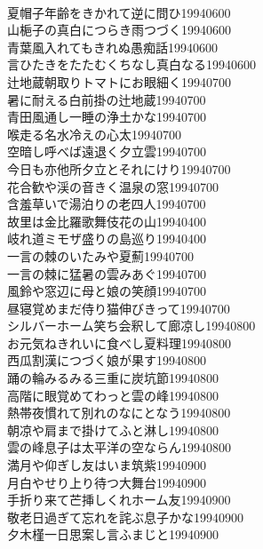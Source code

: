 \begin{multicols}{2}
\\夏帽子年齢をきかれて逆に問ひ\hfill{19940600}
\\山梔子の真白につらき雨つづく\hfill{19940600}
\\青葉風入れてもきれぬ愚痴話\hfill{19940600}
\\言ひたきをたたむくちなし真白なる\hfill{19940600}
\\辻地蔵朝取りトマトにお眼細く\hfill{19940700}
\\暑に耐える白前掛の辻地蔵\hfill{19940700}
\\青田風通し一睡の浄土かな\hfill{19940700}
\\喉走る名水冷えの心太\hfill{19940700}
\\空暗し呼べば遠退く夕立雲\hfill{19940700}
\\今日も亦他所夕立とそれにけり\hfill{19940700}
\\花合歓や渓の音きく温泉の窓\hfill{19940700}
\\含羞草いで湯泊りの老四人\hfill{19940700}
\\故里は金比羅歌舞伎花の山\hfill{19940400}
\\岐れ道ミモザ盛りの島巡り\hfill{19940400}
\\一言の棘のいたみや夏薊\hfill{19940700}
\\一言の棘に猛暑の雲みあぐ\hfill{19940700}
\\風鈴や窓辺に母と娘の笑顔\hfill{19940700}
\\昼寝覚めまだ侍り猫伸びきって\hfill{19940700}
\\シルバーホーム笑ち会釈して廊凉し\hfill{19940800}
\\お元気ねきれいに食べし夏料理\hfill{19940800}
\\西瓜割漢につづく娘が果す\hfill{19940800}
\\踊の輪みるみる三重に炭坑節\hfill{19940800}
\\高階に眼覚めてわっと雲の峰\hfill{19940800}
\\熱帯夜慣れて別れのなにとなう\hfill{19940800}
\\朝凉や肩まで掛けてふと淋し\hfill{19940800}
\\雲の峰息子は太平洋の空ならん\hfill{19940800}
\\満月や仰ぎし友はいま筑紫\hfill{19940900}
\\月白やせり上り待つ大舞台\hfill{19940900}
\\手折り来て芒挿しくれホーム友\hfill{19940900}
\\敬老日過ぎて忘れを詫ぶ息子かな\hfill{19940900}
\\夕木槿一日思案し言ふまじと\hfill{19940900}

\end{multicols}
